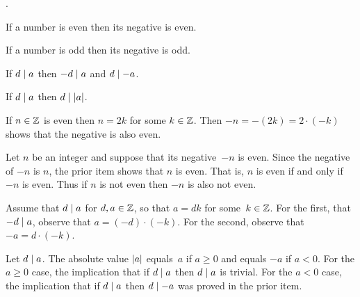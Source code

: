 \documentclass{ibl}
\begin{document}
\begin{ex}
\pord.
\begin{exes}
\item If a number is even then its negative is even.
\item If a number is odd then its negative is odd.
\item If $d\mid a$ then $-d\mid a$ and $d\mid -a$.
\item If $d\mid a$ then $d\mid\lvert a\rvert$.
\end{exes}  
\begin{ans}
\begin{exes}
\item If $n\in\mathbb{Z}$ is even then $n=2k$ for some $k\in\mathbb{Z}$.
Then $-n=-(2k)=2\cdot(-k)$ shows that the negative is also even.
\item Let $n$ be an integer and suppose that its negative~$-n$ is even.
Since the negative of $-n$ is $n$, the prior item shows that $n$ is even.
That is, $n$ is even if and only if $-n$ is even.
Thus if $n$ is not even then $-n$ is also not even.
\item Assume that $d\mid a$ for $d,a\in\mathbb{Z}$, so that 
$a=dk$ for some~$k\in\mathbb{Z}$.
For the first, that $-d\mid a$, observe that
$a=(-d)\cdot(-k)$.
For the second, observe that $-a=d\cdot(-k)$.
\item Let $d\mid a$.
The absolute value $\lvert a\rvert$ equals~$a$ if $a\geq 0$ and equals
$-a$ if $a<0$.
For the $a\geq 0$ case, the implication that if $d\mid a$ then $d\mid a$
is trivial.
For the $a<0$ case, 
the implication that if $d\mid a$ then $d\mid -a$ was
proved in the prior item.
\end{exes}
\end{ans}
\end{ex}
\end{document}
